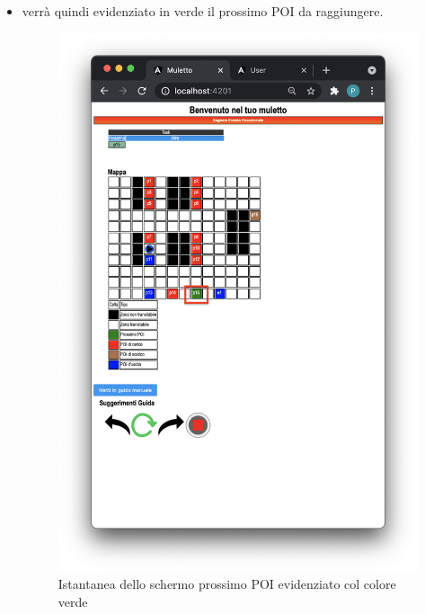 \begin{itemize}
\begin{figure}[H]
    \end{figure}
    \item verrà quindi evidenziato in verde il prossimo POI da raggiungere.
    \begin{figure}[H]
        \centering
        	\includegraphics[scale=0.45]{res/images/next.png}
        	\caption{Istantanea dello schermo prossimo POI evidenziato col colore verde}
    \end{figure}
\end{itemize}

